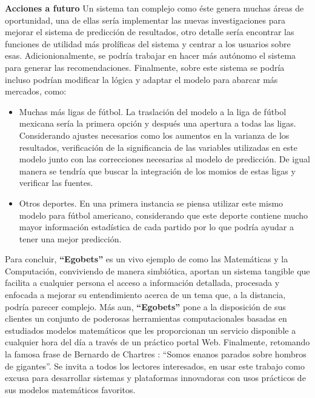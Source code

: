 \textbf{Acciones a futuro}
Un sistema tan complejo como éste genera muchas áreas de oportunidad, una de ellas sería implementar las nuevas investigaciones para mejorar el sistema de predicción de resultados, otro detalle sería encontrar las funciones de utilidad más prolíficas del sistema y centrar a los usuarios sobre esas. Adicionionalmente, se podría trabajar en hacer más autónomo el sistema para generar las recomendaciones. Finalmente, sobre este sistema se podría incluso podrían modificar la lógica y adaptar el modelo para abarcar más mercados, como:
\begin{itemize}

	\item Muchas más ligas de fútbol. La traslación del modelo a la liga de fútbol mexicana sería la primera opción y después una apertura a todas las ligas. Considerando ajustes necesarios como los aumentos en la varianza de los resultados, verificación de la significancia de las variables utilizadas en este modelo junto con las correcciones necesarias al modelo de predicción. De igual manera se tendría que buscar la integración de los momios de estas ligas y verificar las fuentes.

	\item Otros deportes. En una primera instancia se piensa utilizar este mismo modelo para fútbol americano, considerando que este deporte contiene mucho mayor información estadística de cada partido por lo que podría ayudar a tener una mejor predicción.

\end{itemize}

	
Para concluir, \textbf{``Egobets''} es un vivo ejemplo de como las Matemáticas y la Computación, conviviendo de manera simbiótica, aportan un sistema tangible que facilita a cualquier persona el acceso a información detallada, procesada y enfocada a mejorar su entendimiento acerca de un tema que, a la distancia, podría parecer complejo. Más aun, \textbf{``Egobets''} pone a la disposición de sus clientes un conjunto de poderosas herramientas computacionales basadas en estudiados modelos matemáticos que les proporcionan un servicio disponible a cualquier hora del día a través de un práctico portal Web. Finalmente, retomando la famosa frase de Bernardo de Chartres \cite{john1962metalogicon}: ``Somos enanos parados sobre hombros de gigantes''. Se invita a todos los lectores interesados, en usar este trabajo como excusa para desarrollar sistemas y plataformas innovadoras con usos prácticos de sus modelos matemáticos favoritos.
























